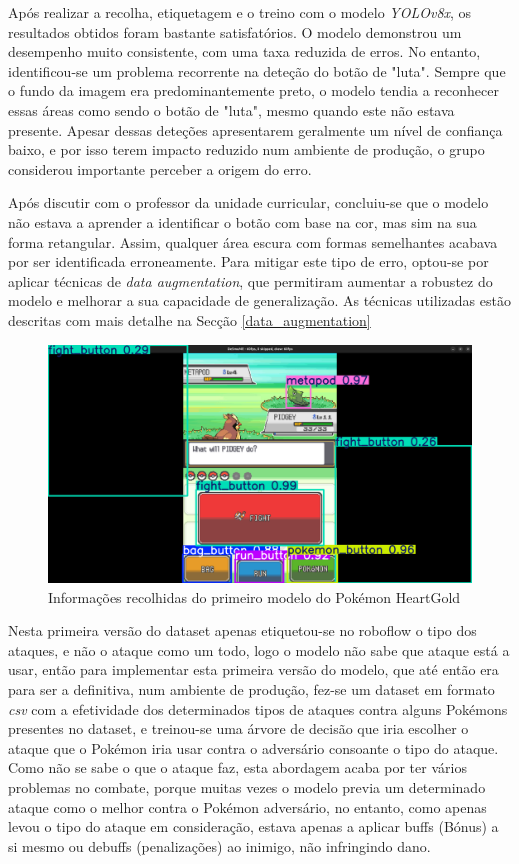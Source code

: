 Após realizar a recolha, etiquetagem e o treino com o modelo \textit{YOLOv8x}, os resultados obtidos foram bastante satisfatórios. O modelo demonstrou um desempenho muito consistente, com uma taxa reduzida de erros. No entanto, identificou-se um problema recorrente na deteção do botão de "luta". Sempre que o fundo da imagem era predominantemente preto, o modelo tendia a reconhecer essas áreas como sendo o botão de "luta", mesmo quando este não estava presente. Apesar dessas deteções apresentarem geralmente um nível de confiança baixo, e por isso terem impacto reduzido num ambiente de produção, o grupo considerou importante perceber a origem do erro.

Após discutir com o professor da unidade curricular, concluiu-se que o modelo não estava a aprender a identificar o botão com base na cor, mas sim na sua forma retangular. Assim, qualquer área escura com formas semelhantes acabava por ser identificada erroneamente. Para mitigar este tipo de erro, optou-se por aplicar técnicas de \textit{data augmentation}, que permitiram aumentar a robustez do modelo e melhorar a sua capacidade de generalização. As técnicas utilizadas estão descritas com mais detalhe na Secção \ref{data_augmentation}

\begin{figure}[h]
    \centering
    \includegraphics[width=0.8\linewidth]{imagens/phg_fight_button.png}
    \caption{Informações recolhidas do primeiro modelo do Pokémon HeartGold}
    \label{fig:phg_primeiro_modelo}
\end{figure}

Nesta primeira versão do dataset apenas etiquetou-se no roboflow o tipo dos ataques, e não o ataque como um todo, logo o modelo não sabe que ataque está a usar, então para implementar esta primeira versão do modelo, que até então era para ser a definitiva, num ambiente de produção, fez-se um dataset em formato \textit{csv} com a efetividade dos determinados tipos de ataques contra alguns Pokémons presentes no dataset, e treinou-se uma árvore de decisão que iria escolher o ataque que o Pokémon iria usar contra o adversário consoante o tipo do ataque. Como não se sabe o que o ataque faz, esta abordagem acaba por ter vários problemas no combate, porque muitas vezes o modelo previa um determinado ataque como o melhor contra o Pokémon adversário, no entanto, como apenas levou o tipo do ataque em consideração, estava apenas a aplicar buffs (Bónus) a si mesmo ou debuffs (penalizações) ao inimigo, não infringindo dano.

